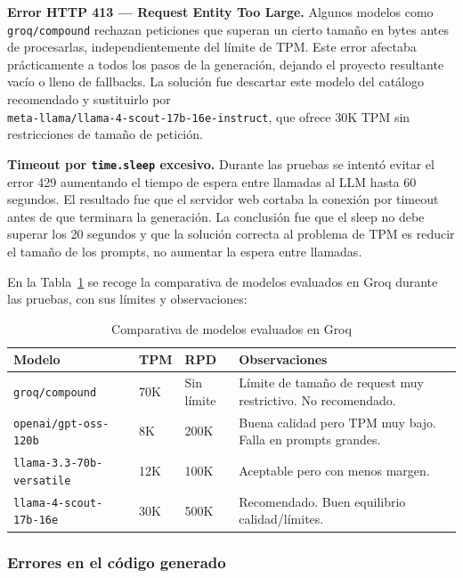 \textbf{Error HTTP 413 — Request Entity Too Large.} Algunos modelos como \texttt{groq/compound} rechazan peticiones que superan un cierto tamaño en bytes antes de procesarlas, independientemente del límite de TPM. Este error afectaba prácticamente a todos los pasos de la generación, dejando el proyecto resultante vacío o lleno de fallbacks. La solución fue descartar este modelo del catálogo recomendado y sustituirlo por \\ \texttt{meta-llama/llama-4-scout-17b-16e-instruct}, que ofrece 30K TPM sin restricciones de tamaño de petición.

\textbf{Timeout por \texttt{time.sleep} excesivo.} Durante las pruebas se intentó evitar el error 429 aumentando el tiempo de espera entre llamadas al LLM hasta 60 segundos. El resultado fue que el servidor web cortaba la conexión por timeout antes de que terminara la generación. La conclusión fue que el sleep no debe superar los 20 segundos y que la solución correcta al problema de TPM es reducir el tamaño de los prompts, no aumentar la espera entre llamadas.


En la Tabla~\ref{tab:modelos-groq} se recoge la comparativa de modelos evaluados en Groq durante las pruebas, con sus límites y observaciones:

\begin{table}[H]
	\centering
	\begin{tabular}{|p{6cm}|l|l|p{4cm}|}
	\hline
	\textbf{Modelo} & \textbf{TPM} & \textbf{RPD} & \textbf{Observaciones} \\
	\hline
	\texttt{groq/compound} & 70K & Sin límite & Límite de tamaño de request muy restrictivo. No recomendado. \\
	\hline
	\texttt{openai/gpt-oss-120b} & 8K & 200K & Buena calidad pero TPM muy bajo. Falla en prompts grandes. \\
	\hline
	\texttt{llama-3.3-70b-versatile} & 12K & 100K & Aceptable pero con menos margen. \\
	\hline
	\texttt{llama-4-scout-17b-16e} & 30K & 500K & Recomendado. Buen equilibrio calidad/límites. \\
	\hline
\end{tabular}
\caption{Comparativa de modelos evaluados en Groq}
\label{tab:modelos-groq}
\end{table}


\subsubsection{Errores en el código generado}
\label{subsubsec:errores-codigo}

